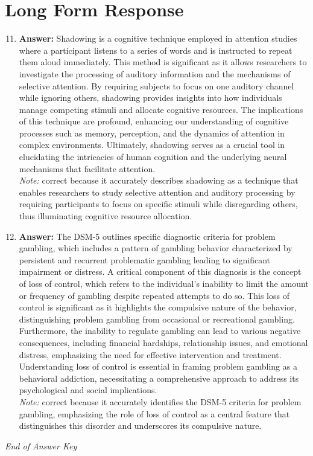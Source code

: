 \documentclass[12pt]{article}
\begin{document}
\section*{Long Form Response}
\begin{enumerate}[label=\arabic*.]
\setcounter{enumi}{10}
\item \textbf{Answer:} Shadowing is a cognitive technique employed in attention studies where a participant listens to a series of words and is instructed to repeat them aloud immediately. This method is significant as it allows researchers to investigate the processing of auditory information and the mechanisms of selective attention. By requiring subjects to focus on one auditory channel while ignoring others, shadowing provides insights into how individuals manage competing stimuli and allocate cognitive resources. The implications of this technique are profound, enhancing our understanding of cognitive processes such as memory, perception, and the dynamics of attention in complex environments. Ultimately, shadowing serves as a crucial tool in elucidating the intricacies of human cognition and the underlying neural mechanisms that facilitate attention.
\\ \textit{Note:} correct because it accurately describes shadowing as a technique that enables researchers to study selective attention and auditory processing by requiring participants to focus on specific stimuli while disregarding others, thus illuminating cognitive resource allocation.
\item \textbf{Answer:} The DSM-5 outlines specific diagnostic criteria for problem gambling, which includes a pattern of gambling behavior characterized by persistent and recurrent problematic gambling leading to significant impairment or distress. A critical component of this diagnosis is the concept of loss of control, which refers to the individual's inability to limit the amount or frequency of gambling despite repeated attempts to do so. This loss of control is significant as it highlights the compulsive nature of the behavior, distinguishing problem gambling from occasional or recreational gambling. Furthermore, the inability to regulate gambling can lead to various negative consequences, including financial hardships, relationship issues, and emotional distress, emphasizing the need for effective intervention and treatment. Understanding loss of control is essential in framing problem gambling as a behavioral addiction, necessitating a comprehensive approach to address its psychological and social implications.
\\ \textit{Note:} correct because it accurately identifies the DSM-5 criteria for problem gambling, emphasizing the role of loss of control as a central feature that distinguishes this disorder and underscores its compulsive nature.
\end{enumerate}

\vfill
\noindent\textit{End of Answer Key}
\end{document}
